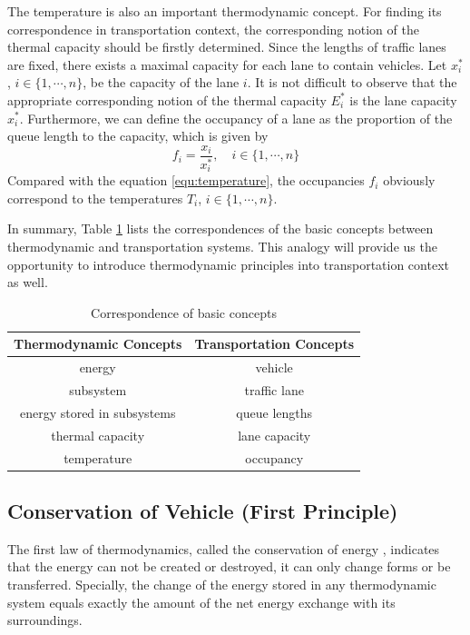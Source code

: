 \documentclass[preprint,authoryear,12pt]{elsarticle}
\begin{document}
The temperature is also an important thermodynamic concept. For finding its correspondence in transportation context, the corresponding notion of the thermal capacity should be firstly determined. Since the lengths of traffic lanes are fixed, there exists a maximal capacity for each lane to contain vehicles. Let $x_i^*$, $i\in\{1,\cdots,n\}$, be the capacity of the lane $i$. It is not difficult to observe that the appropriate corresponding notion of the thermal capacity $E_i^*$ is the lane capacity $x_i^*$. Furthermore, we can define the occupancy of a lane as the proportion of the queue length to the capacity, which is given by
\begin{equation}\label{equ:occupancy}
f_i = \frac{x_i}{x_i^*},\quad i\in\{1,\cdots,n\}
\end{equation}
Compared with the equation \eqref{equ:temperature}, the occupancies $f_i$ obviously correspond to the temperatures $T_i$, $i\in\{1,\cdots,n\}$.

In summary, Table \ref{tab:notions} lists the correspondences of the basic concepts between thermodynamic and transportation systems. This analogy will provide us the opportunity to introduce thermodynamic principles into transportation context as well.

\begin{table}[ht]
\centering \caption{Correspondence of basic concepts}
\label{tab:notions}
\begin{tabular}{cc}
  \hline
  Thermodynamic Concepts & Transportation Concepts \\
  \hline
  energy & vehicle \\
  subsystem & traffic lane \\
  energy stored in subsystems & queue lengths \\
  thermal capacity & lane capacity \\
  temperature & occupancy \\
  \hline
\end{tabular}
\end{table}

\subsection{Conservation of Vehicle (First Principle)}

The first law of thermodynamics, called the conservation of energy \citep{cengel_thermodynamics:_2001}, indicates that the energy can not be created or destroyed, it can only change forms or be transferred. Specially, the change of the energy stored in any thermodynamic system equals exactly the amount of the net energy exchange with its surroundings.
\end{document}
